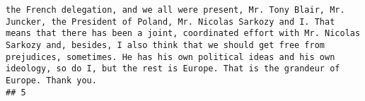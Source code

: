 \documentclass[
]{article}
\begin{document}
\begin{verbatim}
the French delegation, and we all were present, Mr. Tony Blair, Mr. Juncker, the President of Poland, Mr. Nicolas Sarkozy and I. That means that there has been a joint, coordinated effort with Mr. Nicolas Sarkozy and, besides, I also think that we should get free from prejudices, sometimes. He has his own political ideas and his own ideology, so do I, but the rest is Europe. That is the grandeur of Europe. Thank you.
## 5                                                                                                                                                                                                                                                                                                                                                                                                                                                                                                                                                                                                                                                                                                                                                                                                                                                                                                                                                                                                                                                                                                                                                                                                                                                                                                                                                                                                                                                                                                                                                                                                                                                                                                                                                                                                                                                                                                                                                                                                                                                                                                                                                                                                                                                                                                                                                                                                                                                                                                                                                                                                                                                                                                                                                                                                                                                                                                                                                                                                              
\end{verbatim}
\end{document}
